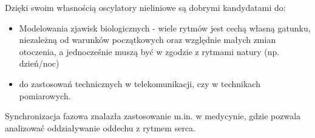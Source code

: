 Dzięki swoim własnością oscylatory nieliniowe są dobrymi kandydatami do:
\begin{itemize}
	\item Modelowania zjawisk biologicznych - wiele rytmów jest cechą własną gatunku, niezależną od warunków początkowych oraz względnie małych zmian otoczenia, a jednocześnie muszą być w zgodzie z rytmami natury (np. dzień/noc)
	\item do zastosowań technicznych w telekomunikacji, czy w technikach pomiarowych.
\end{itemize}

Synchronizacja fazowa znalazła zastosowanie m.in. w medycynie, gdzie pozwala analizować oddziaływanie oddechu z rytmem serca.
